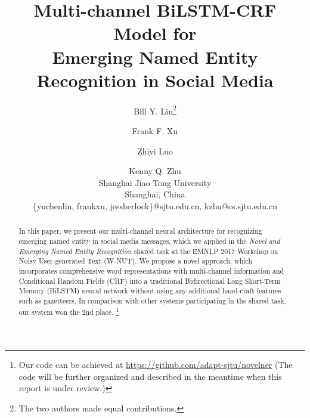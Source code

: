 \documentclass[11pt,letterpaper]{article}
\title{Multi-channel BiLSTM-CRF Model for\\  Emerging Named Entity Recognition in Social Media}
\author{Bill Y. Lin\thanks{\quad The two authors made equal contributions.} \and Frank F. Xu\footnotemark[1] \and Zhiyi Luo \and Kenny Q. Zhu \\
	Shanghai Jiao Tong University \\ Shanghai, China\\ \{yuchenlin, frankxu, jessherlock\}@sjtu.edu.cn, kzhu@cs.sjtu.edu.cn}
\begin{document}
\maketitle
\begin{abstract}
In this paper, we present our multi-channel neural architecture for recognizing emerging named entity in social media messages,
which we applied in the \textit{Novel and Emerging Named Entity Recognition} shared task 
at the EMNLP
2017 Workshop on Noisy User-generated Text (W-NUT). 
We propose a novel approach, which incorporates comprehensive word representations with multi-channel information and Conditional Random Fields (CRF) into a traditional Bidirectional Long Short-Term Memory
(BiLSTM) neural network
without using any additional hand-craft features such as gazetteers. 
In comparison with other systems participating in the shared task, our system won the 2nd place.
\footnote{Our code can be achieved at \url{https://github.com/adapt-sjtu/novelner}  (The code will be further organized and described in the meantime when this report is under review.)}
\end{abstract}









\end{document}
